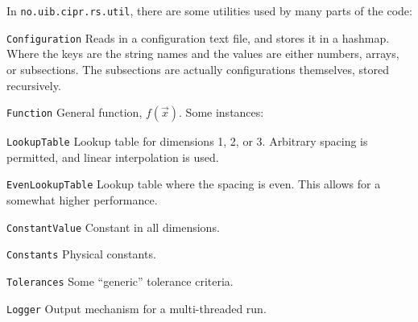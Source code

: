 In \texttt{no.uib.cipr.rs.util}, there are some utilities used by many
parts of the code:
\begin{list}{}{}
\item[\texttt{Configuration}] Reads in a configuration text file, and
  stores it in a hashmap. Where the keys are the string names and the
  values are either numbers, arrays, or subsections. The subsections
  are actually configurations themselves, stored recursively.
\item[\texttt{Function}] General function, $f(\vec x)$. Some instances:
  \begin{list}{}{}
  \item[\texttt{LookupTable}] Lookup table for dimensions 1, 2, or 3.
    Arbitrary spacing is permitted, and linear interpolation is used.
  \item[\texttt{EvenLookupTable}] Lookup table where the spacing is
    even. This allows for a somewhat higher performance.
  \item[\texttt{ConstantValue}] Constant in all dimensions.
  \end{list}
\item[\texttt{Constants}] Physical constants.
\item[\texttt{Tolerances}] Some ``generic'' tolerance criteria.
\item[\texttt{Logger}] Output mechanism for a multi-threaded run.
\end{list}

